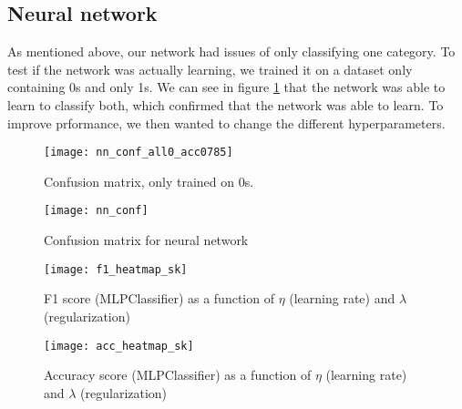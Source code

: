 \documentclass[11pt,english, A4]{article}
\begin{document}


\subsection{Neural network}

As mentioned above, our network had issues of only classifying one category. To test if the network was actually learning, we trained it on a dataset only containing 0s and only 1s. We can see in figure \ref{fig:nn_conf_all0_acc0785} that the network was able to learn to classify both, which confirmed that the network was able to learn. To improve prformance, we then wanted to change the different hyperparameters.




\begin{figure}[H]
\begin{center}
  \texttt{[image: nn\_conf\_all0\_acc0785]}
  \caption{Confusion matrix, only trained on 0s.}
  \label{fig:nn_conf_all0_acc0785}
  \end{center}
\end{figure}


\begin{figure}[H]
\begin{center}
  \texttt{[image: nn\_conf]}
  \caption{Confusion matrix for neural network}
  \label{fig:nn_conf}
  \end{center}
\end{figure}


\begin{figure}[H]
\begin{center}
  \texttt{[image: f1\_heatmap\_sk]}
  \caption{F1 score (MLPClassifier) as a function of $\eta$ (learning rate) and $\lambda$ (regularization)}
  \label{fig:f1_sk}
  \end{center}
\end{figure}


\begin{figure}[H]
\begin{center}
  \texttt{[image: acc\_heatmap\_sk]}
  \caption{Accuracy score (MLPClassifier) as a function of $\eta$ (learning rate) and $\lambda$ (regularization)}
  \label{fig:acc_sk}
  \end{center}
\end{figure}
\end{document}
